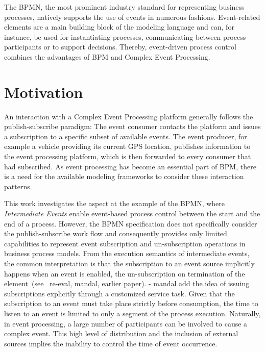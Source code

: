 The \ac{BPMN}, the most prominent industry standard for representing business processes, %
natively supports the use of events in numerous fashions. Event-related elements are a main building block of the modeling language and can, for instance, be used for instantiating processes, communicating between process participants or to support decisions.
Thereby, event-driven process control combines the advantages of \acl{BPM} and Complex Event Processing.


\section{Motivation}

An interaction with a Complex Event Processing platform generally follows the publish-subscribe paradigm: The event consumer contacts the platform and issues a subscription to a specific subset of available events.
The event producer, for example a vehicle providing its current GPS location, publishes information to the event processing platform, which is then forwarded to every consumer that had subscribed.
As event processing has become an essential part of \ac{BPM}, there is a need for the available modeling frameworks to consider these interaction patterns.

This work investigates the aspect at the example of the \ac{BPMN}, where \textit{Intermediate Events} enable event-based process control between the start and the end of a process. %
However, the BPMN specification does not specifically consider the publish-subscribe work flow and consequently provides only limited capabilities to represent event subscription and un-subscription operations in business process models.
From the execution semantics of intermediate events, the common interpretation is that the subscription to an event source implicitly happens when an event is enabled, the un-subscription on termination of the element~(see~\cite{} re-eval, mandal, earlier paper).
- mandal add the idea of issuing subscriptions explicitly through a customized service task.
Given that the subscription to an event must take place strictly before consumption, the time to listen to an event is limited to only a segment of the process execution.
Naturally, in event processing, a large number of participants can be involved to cause a complex event. This high level of distribution and the inclusion of external sources implies the inability to control the time of event occurrence.%

